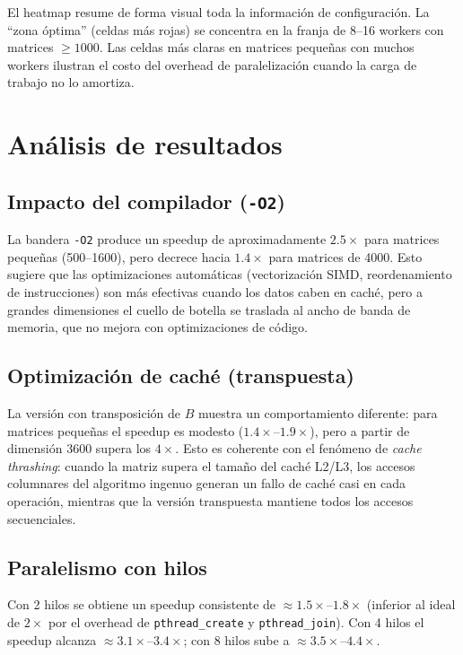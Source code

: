 \documentclass{article}
\begin{document}
El heatmap resume de forma visual toda la información de configuración. La ``zona óptima'' (celdas más rojas) se concentra en la franja de 8--16 workers con matrices $\geq 1000$. Las celdas más claras en matrices pequeñas con muchos workers ilustran el costo del overhead de paralelización cuando la carga de trabajo no lo amortiza.


\section{Análisis de resultados}

\subsection{Impacto del compilador (\texttt{-O2})}

La bandera \texttt{-O2} produce un speedup de aproximadamente $2.5\times$ para matrices pequeñas (500--1600), pero decrece hacia $1.4\times$ para matrices de 4000. Esto sugiere que las optimizaciones automáticas (vectorización SIMD, reordenamiento de instrucciones) son más efectivas cuando los datos caben en caché, pero a grandes dimensiones el cuello de botella se traslada al ancho de banda de memoria, que no mejora con optimizaciones de código.

\subsection{Optimización de caché (transpuesta)}

La versión con transposición de $B$ muestra un comportamiento diferente: para matrices pequeñas el speedup es modesto ($1.4\times$--$1.9\times$), pero a partir de dimensión 3600 supera los $4\times$. Esto es coherente con el fenómeno de \emph{cache thrashing}: cuando la matriz supera el tamaño del caché L2/L3, los accesos columnares del algoritmo ingenuo generan un fallo de caché casi en cada operación, mientras que la versión transpuesta mantiene todos los accesos secuenciales.

\subsection{Paralelismo con hilos}

Con 2 hilos se obtiene un speedup consistente de $\approx 1.5\times$--$1.8\times$ (inferior al ideal de $2\times$ por el overhead de \texttt{pthread\_create} y \texttt{pthread\_join}). Con 4 hilos el speedup alcanza $\approx 3.1\times$--$3.4\times$; con 8 hilos sube a $\approx 3.5\times$--$4.4\times$.
\end{document}
